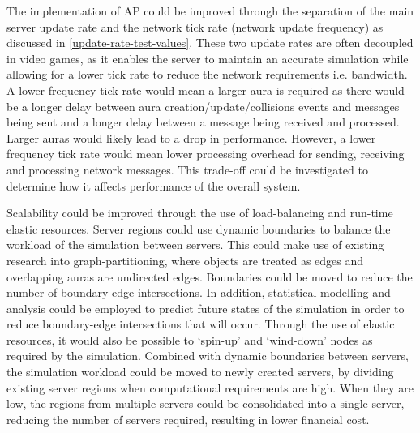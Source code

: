 The implementation of AP could be improved through the separation of the main server update rate and the network tick rate (network update frequency) as discussed in \ref{update-rate-test-values}. These two update rates are often decoupled in video games, as it enables the server to maintain an accurate simulation while allowing for a lower tick rate to reduce the network requirements i.e. bandwidth. A lower frequency tick rate would mean a larger aura is required as there would be a longer delay between aura creation/update/collisions events and messages being sent and a longer delay between a message being received and processed. Larger auras would likely lead to a drop in performance. However, a lower frequency tick rate would mean lower processing overhead for sending, receiving and processing network messages. This trade-off could be investigated to determine how it affects performance of the overall system.



Scalability could be improved through the use of load-balancing and run-time elastic resources. Server regions could use dynamic boundaries to balance the workload of the simulation between servers. This could make use of existing research into graph-partitioning, where objects are treated as edges and overlapping auras are undirected edges. Boundaries could be moved to reduce the number of boundary-edge intersections. In addition, statistical modelling and analysis could be employed to predict future states of the simulation in order to reduce boundary-edge intersections that will occur. Through the use of elastic resources, it would also be possible to `spin-up' and `wind-down' nodes as required by the simulation. Combined with dynamic boundaries between servers, the simulation workload could be moved to newly created servers, by dividing existing server regions when computational requirements are high. When they are low, the regions from multiple servers could be consolidated into a single server, reducing the number of servers required, resulting in lower financial cost.

